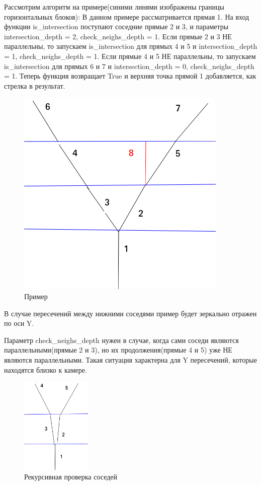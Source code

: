 Рассмотрим алгоритм на примере(синими линями изображены границы горизонтальных блоков): 
\newline
В данном примере рассматривается прямая 1. \newline На вход функции is\_intersection поступают соседние прямые 2 и 3, и параметры intersection\_depth = 2, check\_neighs\_depth = 1.
\newline
Если прямые 2 и 3 НЕ параллельны, то запускаем is\_intersection для прямых 4 и 5 и intersection\_depth = 1, check\_neighs\_depth = 1.
\newline
Если прямые 4 и 5 НЕ параллельны, то запускаем  is\_intersection для прямых 6 и 7 и intersection\_depth = 0, check\_neighs\_depth = 1. Теперь функция возвращает True и верхняя точка прямой 1 добавляется, как стрелка в результат.
\begin{figure}[!h]
	\centering
	\includegraphics[width=0.7\linewidth]{pictures/intersection_example}
	\caption[Intersection]{Пример}
	\label{fig:intersectionexample}
\end{figure}

В случае пересечений между нижними соседями пример будет зеркально отражен по оси Y.

\newpage
Параметр check\_neighs\_depth нужен в случае, когда сами соседи являются параллельными(прямые 2 и 3), но их продолжения(прямые 4 и 5) уже НЕ являются параллельными. Такая ситуация характерна для Y пересечений, которые находятся близко к камере.
\begin{figure}[!h]
	\centering
	\includegraphics[width=0.3\textwidth, height=0.2\textheight]{pictures/intersection_example1}
	\caption{Рекурсивная проверка соседей}
	\label{fig:intersectionexample1}
\end{figure}

